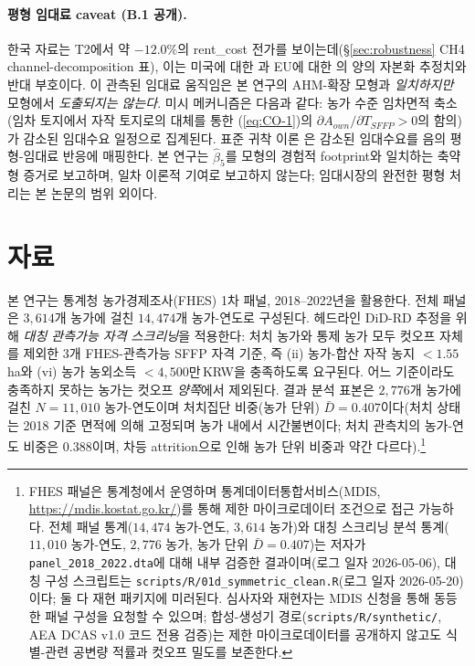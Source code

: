 \documentclass[12pt, a4paper]{article}
\begin{document}
\paragraph{평형 임대료 caveat (B.1 공개).} 한국 자료는 T2에서 약 $-12.0\%$의 rent\_cost 전가를 보이는데(\S\ref{sec:robustness} CH4 channel-decomposition 표), 이는 미국에 대한 \citet{Kirwan2009_rentcap}과 EU에 대한 \citet{BaldoniCiaian2023_eucap}의 양의 자본화 추정치와 반대 부호이다. 이 관측된 임대료 움직임은 본 연구의 AHM-확장 모형과 \emph{일치하지만} 모형에서 \emph{도출되지는 않는다}. 미시 메커니즘은 다음과 같다: 농가 수준 임차면적 축소(임차 토지에서 자작 토지로의 대체를 통한 (\ref{eq:CO-1})의 $\partial A_{own}/\partial T_{SFFP} > 0$의 함의)가 감소된 임대수요 일정으로 집계된다. 표준 귀착 이론 \citep{Floyd1965_incidence, AlstonJames2002_incidence}은 감소된 임대수요를 음의 평형-임대료 반응에 매핑한다. 본 연구는 $\hat\beta_5$를 모형의 경험적 footprint와 일치하는 축약형 증거로 보고하며, 일차 이론적 기여로 보고하지 않는다; 임대시장의 완전한 평형 처리는 본 논문의 범위 외이다.

\section{자료}
\label{sec:data}

본 연구는 통계청 농가경제조사(FHES) 1차 패널, 2018--2022년을 활용한다. 전체 패널은 $3{,}614$개 농가에 걸친 $14{,}474$개 농가-연도로 구성된다. 헤드라인 DiD-RD 추정을 위해 \emph{대칭 관측가능 자격 스크리닝}을 적용한다: 처치 농가와 통제 농가 모두 컷오프 자체를 제외한 3개 FHES-관측가능 SFFP 자격 기준, 즉 (ii) 농가-합산 자작 농지 $< 1.55$\,ha와 (vi) 농가 농외소득 $< 4{,}500$만\,KRW을 충족하도록 요구된다. 어느 기준이라도 충족하지 못하는 농가는 컷오프 \emph{양쪽}에서 제외된다. 결과 분석 표본은 $2{,}776$개 농가에 걸친 $N = 11{,}010$ 농가-연도이며 처치집단 비중(농가 단위) $\bar D = 0.407$이다(처치 상태는 2018 기준 면적에 의해 고정되며 농가 내에서 시간불변이다; 처치 관측치의 농가-연도 비중은 $0.388$이며, 차등 attrition으로 인해 농가 단위 비중과 약간 다르다).\footnote{FHES 패널은 통계청에서 운영하며 통계데이터통합서비스(MDIS, \url{https://mdis.kostat.go.kr/})를 통해 제한 마이크로데이터 조건으로 접근 가능하다. 전체 패널 통계($14{,}474$ 농가-연도, $3{,}614$ 농가)와 대칭 스크리닝 분석 통계($11{,}010$ 농가-연도, $2{,}776$ 농가, 농가 단위 $\bar D = 0.407$)는 저자가 \texttt{panel\_2018\_2022.dta}에 대해 내부 검증한 결과이며(로그 일자 2026-05-06), 대칭 구성 스크립트는 \texttt{scripts/R/01d\_symmetric\_clean.R}(로그 일자 2026-05-20)이다; 둘 다 재현 패키지에 미러된다. 심사자와 재현자는 MDIS 신청을 통해 동등한 패널 구성을 요청할 수 있으며; 합성-생성기 경로(\texttt{scripts/R/synthetic/}, AEA DCAS v1.0 코드 전용 검증)는 제한 마이크로데이터를 공개하지 않고도 식별-관련 공변량 적률과 컷오프 밀도를 보존한다.}
\end{document}
